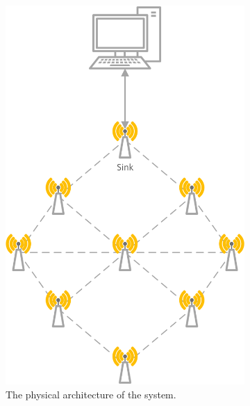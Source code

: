\begin{figure}[]
	\centering
	\begin{subfigure}[t]{0.4\textwidth}
		\centering
    		\includegraphics[scale=0.6]{content/images/Architecture}
   	 	\caption{The physical architecture of the system.}
    	\label{fig:architecture}
    \end{subfigure}
    \quad
    \quad
    \quad
    \begin{subfigure}[t]{0.4\textwidth}
		\centering         

\end{subfigure}
\end{figure}

